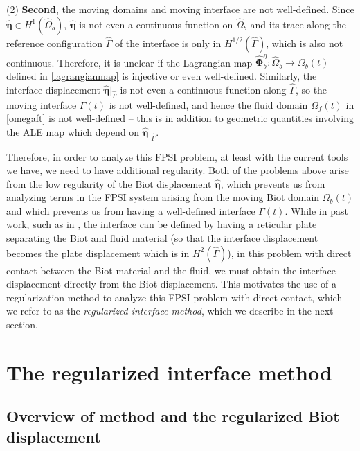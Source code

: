 \documentclass[11pt]{article}
\newcommand{\bd}{\boldsymbol}
\theoremstyle{definition}
\begin{document}
\medskip

\noindent (2) \textbf{Second}, the moving domains and moving interface are not well-defined. Since $\hat{\bd{\eta}} \in H^{1}(\hat{\Omega}_{b})$, $\hat{\bd{\eta}}$ is not even a continuous function on $\hat{\Omega}_{b}$ and its trace along the reference configuration $\hat{\Gamma}$ of the interface is only in $H^{1/2}(\hat{\Gamma})$, which is also not continuous. Therefore, it is unclear if the Lagrangian map $\hat{\bd{\Phi}}^{\eta}_{b}: \hat{\Omega}_{b} \to \Omega_{b}(t)$ defined in \eqref{lagrangianmap} is injective or even well-defined. Similarly, the interface displacement $\hat{\bd{\eta}}|_{\hat{\Gamma}}$ is not even a continuous function along $\hat{\Gamma}$, so the moving interface $\Gamma(t)$ is not well-defined, and hence the fluid domain $\Omega_{f}(t)$ in \eqref{omegaft} is not well-defined
-- this is in addition to geometric quantities involving the ALE map which depend on $\hat{\bd{\eta}}|_{\hat{\Gamma}}$.

\medskip

Therefore, in order to analyze this FPSI problem, at least with the current tools we have, we need to have additional regularity. Both of the problems above arise from the low regularity of the Biot displacement $\hat{\bd{\eta}}$, which prevents us from analyzing terms in the FPSI system arising from the moving Biot domain $\Omega_{b}(t)$ and which prevents us from having a well-defined interface $\Gamma(t)$. While in past work, such as in \cite{NonlinearFPSI_CRM23, FPSIJMPA}, the interface can be defined by having a reticular plate separating the Biot and fluid material (so that the interface displacement becomes the plate displacement which is in $H^{2}(\hat{\Gamma})$), in this problem with direct contact between the Biot material and the fluid, we must obtain the interface displacement directly from the Biot displacement. This motivates the use of a regularization method to analyze this FPSI problem with direct contact, which we refer to as the \emph{regularized interface method}, which we describe in the next section.

\section{The regularized interface method}\label{regintmethod}

\subsection{Overview of method and the regularized Biot displacement}
\end{document}
